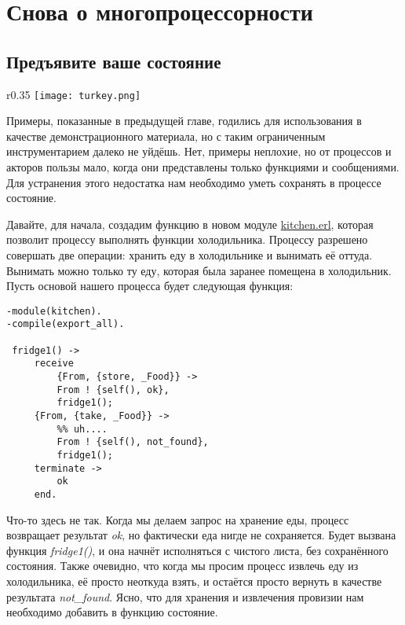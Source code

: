 \chapter{Снова о многопроцессорности}
\section{Предъявите ваше состояние}
\begin{wrapfigure}{r}{0.35\linewidth}
    \texttt{[image: turkey.png]}
\end{wrapfigure}
Примеры, показанные в предыдущей главе, годились для использования в качестве демонстрационного материала, но с таким ограниченным инструментарием далеко не уйдёшь.
Нет, примеры неплохие, но от процессов и акторов пользы мало, когда они представлены только функциями и сообщениями.
Для устранения этого недостатка нам необходимо уметь сохранять в процессе состояние.

Давайте, для начала, создадим функцию в новом модуле \href{http://learnyousomeerlang.com/static/erlang/kitchen.erl}{kitchen.erl}, которая позволит процессу выполнять функции холодильника.
Процессу разрешено совершать две операции: хранить еду в холодильнике и вынимать её оттуда.
Вынимать можно только ту еду, которая была заранее помещена в холодильник.
Пусть основой нашего процесса будет следующая функция:
\begin{lstlisting}[style=erlang]
-module(kitchen).
-compile(export_all).
 
 fridge1() ->
     receive
         {From, {store, _Food}} ->
         From ! {self(), ok},
         fridge1();
     {From, {take, _Food}} ->
         %% uh....
         From ! {self(), not_found},
         fridge1();
     terminate ->
         ok
     end.
\end{lstlisting}

Что\--то здесь не так.
Когда мы делаем запрос на хранение еды, процесс возвращает результат \emph{ok}, но фактически еда нигде не сохраняется.
Будет вызвана функция \emph{fridge1()}, и она начнёт исполняться с чистого листа, без сохранённого состояния.
Также очевидно, что когда мы просим процесс извлечь еду из холодильника, её просто неоткуда взять, и остаётся просто вернуть в качестве результата \emph{not\_found}.
Ясно, что для хранения и извлечения провизии нам необходимо добавить в функцию состояние.

